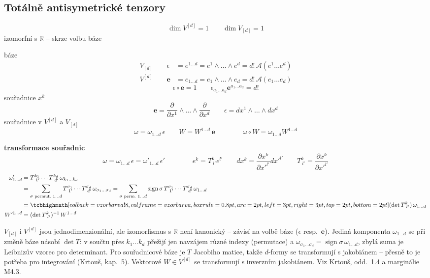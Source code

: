 \subsection{Totálně antisymetrické tenzory}

\[
  \dim V^{[d]} = 1 \qquad \dim V_{[d]} = 1
\]
izomorfní s $\mathbb{R}$ -- skrze volbu báze

báze
\begin{align*}
  V_{[d]}\qquad \epsilon &= e^{1\dots d} = e^1\wedge\dots\wedge e^d = d!\,\mathcal{A}(e^1\dots e^d) \\
  V^{[d]}\qquad \mathbf{e} &= e_{1\dots d} = e_1\wedge\dots\wedge e_d = d!\,\mathcal{A}(e_1\dots e_d)
\end{align*}
\[
  \epsilon\circ\mathbf{e} = 1 \qquad \epsilon_{a_1\dots a_d}\mathbf{e}^{a_1\dots a_d} = d!
\]
souřadnice $x^k$
\[
  \mathbf{e} = \frac{\partial}{\partial x^1}\wedge\dots\wedge\frac{\partial}{\partial x^d} \qquad
  \epsilon = dx^1\wedge\dots\wedge dx^d
\]
souřadnice v $V^{[d]}$ a $V_{[d]}$
\[
  \omega = \omega_{1\dots d}\,\epsilon \qquad W = W^{1\dots d}\,\mathbf{e} \qquad\qquad
  \omega\circ W = \omega_{1\dots d}W^{1\dots d}
\]

\textbf{transformace souřadnic}
\[
  \omega = \omega_{1\dots d}\,\epsilon = \omega'_{1\dots d}\,\epsilon' \qquad\qquad
  e^k = T^k_{\ l'}e^{l'} \qquad dx^k = \frac{\partial x^k}{\partial x'^{l'}}dx'^{l'} \qquad
  T^k_{\ l'} = \frac{\partial x^k}{\partial x'^{l'}}
\]
\begin{align*}
  \omega'_{1\dots d} &= T^{k_1}_{\ 1'}\cdots T^{k_d}_{\ d'}\,\omega_{k_1\dots k_d} \\
  &= \sum_{\sigma\text{ permut.\ }1\dots d}T^{\sigma_1}_{\ 1'}\cdots T^{\sigma_d}_{\ d'}\,\omega_{\sigma_1\dots\sigma_d}
   = \sum_{\sigma\text{ perm.\ }1\dots d}\operatorname{sign}\sigma\,T^{\sigma_1}_{\ 1'}\cdots T^{\sigma_d}_{\ d'}\,\omega_{1\dots d} \\
  &= \vzorec{(\det T^k_{\ l'})\,\omega_{1\dots d}} \\
  W'^{1\dots d} &= (\det T^k_{\ l'})^{-1}\,W^{1\dots d}
\end{align*}

\begin{vysvetleni}
$V_{[d]}$ i $V^{[d]}$ jsou jednodimenzionální, ale izomorfismus s $\mathbb{R}$ není kanonický -- závisí na volbě báze ($\epsilon$ resp.\ $\mathbf{e}$). Jediná komponenta $\omega_{1\dots d}$ se při změně báze násobí $\det T$: v součtu přes $k_1\dots k_d$ přežijí jen navzájem různé indexy (permutace) a $\omega_{\sigma_1\dots\sigma_d}=\operatorname{sign}\sigma\,\omega_{1\dots d}$, zbylá suma je Leibnizův vzorec pro determinant.
Pro souřadnicové báze je $T$ Jacobiho matice, takže $d$-formy se transformují s jakobiánem -- přesně to je potřeba pro integrování (Krtouš, kap.~5). Vektorové $W\in V^{[d]}$ se transformují s inverzním jakobiánem.
Viz Krtouš, odd.~1.4 a marginálie M4.3.
\end{vysvetleni}


